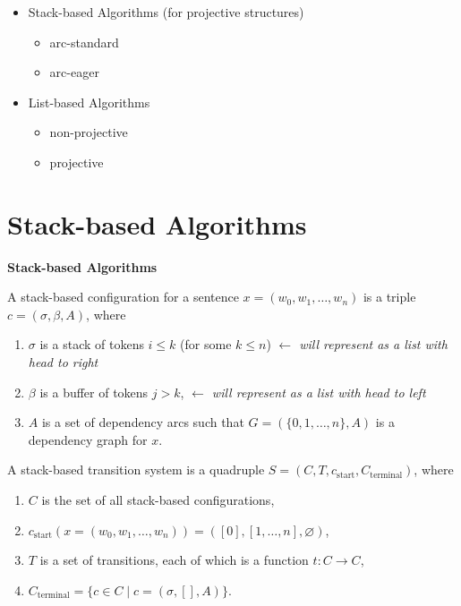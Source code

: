 \documentclass[10pt]{beamer}%
\theoremstyle{remark}
\begin{document}
\begin{frame}
  \onslide<+->

  \begin{itemize}
    \item Stack-based Algorithms (for projective structures)
      \begin{itemize}
        \item arc-standard
        \item arc-eager
      \end{itemize}
    \item List-based Algorithms
      \begin{itemize}
        \item non-projective
        \item projective
      \end{itemize}
  \end{itemize}

\end{frame}

\section{Stack-based Algorithms}

\begin{frame}

  \textbf{Stack-based Algorithms}

  \begin{definition}
    A \alert{stack-based configuration} for a sentence $x = (w_0, w_1, \ldots, w_n)$ is a triple $c = (\sigma,\beta, A)$, where
    \begin{enumerate}
      \item $\sigma$ is a stack of tokens $i \le k$ (for some $k \le n$)
        \hfill\emph{\small $\leftarrow$ will represent as a list with head to right}
      \item $\beta$ is a buffer of tokens $j > k$,
        \hfill\emph{\small $\leftarrow$ will represent as a list with head to left\phantom{w}}
      \item $A$ is a set of dependency arcs such that $G = (\{0, 1, \ldots, n\}, A)$ is a dependency graph for $x$.
    \end{enumerate}
  \end{definition}


  \begin{definition}
    A \alert{stack-based transition system} is a quadruple $S = (C, T, c_\mathrm{start} , C_\mathrm{terminal})$, where
    \begin{enumerate}
      \item $C$ is the set of all stack-based configurations,
      \item $c_\mathrm{start}(x = (w_0,w_1,\ldots,w_n)) = ([0],[1,\ldots,n],\varnothing)$,
      \item $T$ is a set of transitions, each of which is a function $t : C \to C$,
      \item $C_\mathrm{terminal} = \{c \in C \mid c = (\sigma,[],A)\}$.
    \end{enumerate}
  \end{definition}
\end{frame}
\end{document}
